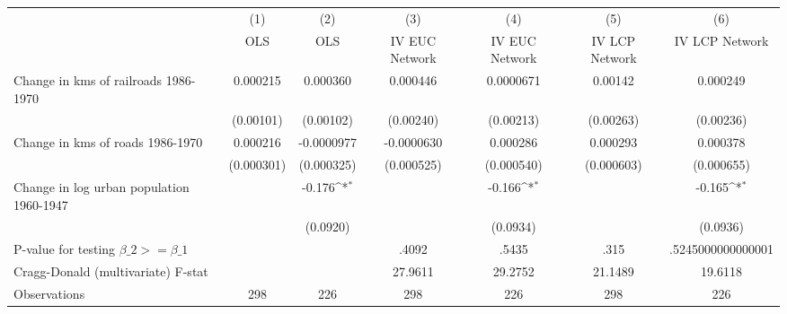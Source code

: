 {
\def\sym#1{\ifmmode^{#1}\else\(^{#1}\)\fi}
\begin{tabular}{l*{6}{c}}
\hline\hline
                &\multicolumn{1}{c}{(1)}&\multicolumn{1}{c}{(2)}&\multicolumn{1}{c}{(3)}&\multicolumn{1}{c}{(4)}&\multicolumn{1}{c}{(5)}&\multicolumn{1}{c}{(6)}\\
                &\multicolumn{1}{c}{OLS}&\multicolumn{1}{c}{OLS}&\multicolumn{1}{c}{IV EUC Network}&\multicolumn{1}{c}{IV EUC Network}&\multicolumn{1}{c}{IV LCP Network}&\multicolumn{1}{c}{IV LCP Network}\\
\hline
Change in kms of railroads 1986-1970& 0.000215         & 0.000360         & 0.000446         &0.0000671         &  0.00142         & 0.000249         \\
                &(0.00101)         &(0.00102)         &(0.00240)         &(0.00213)         &(0.00263)         &(0.00236)         \\
[1em]
Change in kms of roads 1986-1970& 0.000216         &-0.0000977         &-0.0000630         & 0.000286         & 0.000293         & 0.000378         \\
                &(0.000301)         &(0.000325)         &(0.000525)         &(0.000540)         &(0.000603)         &(0.000655)         \\
[1em]
Change in log urban population 1960-1947&                  &   -0.176\sym{*}  &                  &   -0.166\sym{*}  &                  &   -0.165\sym{*}  \\
                &                  & (0.0920)         &                  & (0.0934)         &                  & (0.0936)         \\
\hline
P-value for testing $\beta\_{2} >= \beta\_{1}$&                  &                  &    .4092         &    .5435         &     .315         &.5245000000000001         \\
Cragg-Donald (multivariate) F-stat&                  &                  &  27.9611         &  29.2752         &  21.1489         &  19.6118         \\
Observations    &      298         &      226         &      298         &      226         &      298         &      226         \\
\hline\hline
\end{tabular}
}
